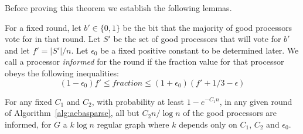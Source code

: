 \documentclass{sig-alternate}
\begin{document}
Before proving this theorem we establish the following lemmas.

For a fixed round, let $b' \in \{ 0, 1\}$ be the bit that the majority of good processors vote for in that round.  Let $S'$ be the set of good processors that will vote for $b'$ and let $f' = |S'|/n$.  Let $\epsilon_{0}$ be a fixed positive constant to be determined later.  We call a processor \emph{informed} for the round if the fraction value for that processor obeys the following inequalities:
$$
(1-\epsilon_{0}) f'  \leq fraction \leq (1+\epsilon_{0}) (f' + 1/3 - \epsilon)
$$


\begin{lemma}
For any fixed $C_{1}$ and $C_{2}$, with probability at least $1- e^{-C_{1}n}$, in any given round of Algorithm~\ref{alg:aebasparse}, all but $C_{2}n/\log n$ of the good processors are informed, for $G$ a $k \log n$ regular graph where $k$ depends only on $C_{1}$, $C_{2}$ and $\epsilon_{0}$. 
\end{lemma}
\end{document}
